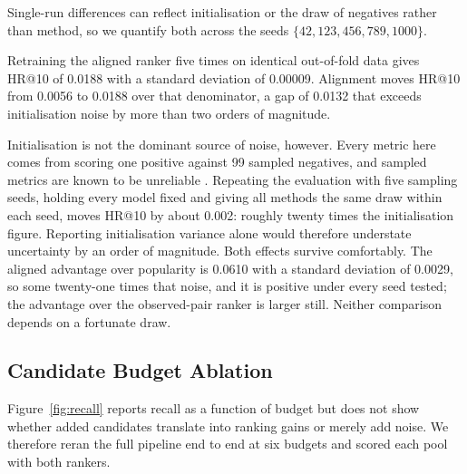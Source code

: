 \documentclass[10pt,twocolumn]{article}
\begin{document}
Single-run differences can reflect initialisation or the draw of negatives
rather than method, so we quantify both across the seeds
$\{42, 123, 456, 789, 1000\}$.

Retraining the aligned ranker five times on identical out-of-fold data gives
HR@10 of 0.0188 with a standard deviation of 0.00009. Alignment moves HR@10
from 0.0056 to 0.0188 over that denominator, a gap of 0.0132 that exceeds
initialisation noise by more than two orders of magnitude.

Initialisation is not the dominant source of noise, however. Every metric here
comes from scoring one positive against 99 sampled negatives, and sampled
metrics are known to be unreliable \citep{krichene2020sampled}. Repeating the
evaluation with five sampling seeds, holding every model fixed and giving all
methods the same draw within each seed, moves HR@10 by about 0.002: roughly
twenty times the initialisation figure. Reporting initialisation variance
alone would therefore understate uncertainty by an order of magnitude. Both
effects survive comfortably. The aligned advantage over popularity is 0.0610
with a standard deviation of 0.0029, so some twenty-one times that noise, and
it is positive under every seed tested; the advantage over the observed-pair
ranker is larger still. Neither comparison depends on a fortunate draw.

\subsection{Candidate Budget Ablation}
\label{sec:budget}

Figure~\ref{fig:recall} reports recall as a function of budget but does not
show whether added candidates translate into ranking gains or merely add
noise. We therefore reran the full pipeline end to end at six budgets and
scored each pool with both rankers.
\end{document}

